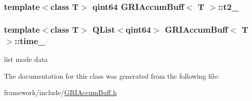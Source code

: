 \hypertarget{classGRIAccumBuff_ad0a83f96ba721ae8206fe6f0d9d80149}{
\subsubsection[{t2\-\_\-}]{\setlength{\rightskip}{0pt plus 5cm}template$<$class \-T$>$ qint64 {\bf \-G\-R\-I\-Accum\-Buff}$<$ \-T $>$\-::{\bf t2\-\_\-}}}\label{classGRIAccumBuff_ad0a83f96ba721ae8206fe6f0d9d80149}
\hypertarget{classGRIAccumBuff_a9e86e603efd9fd1fc2b81e150886a110}{
\subsubsection[{time\-\_\-}]{\setlength{\rightskip}{0pt plus 5cm}template$<$class \-T$>$ \-Q\-List$<$qint64$>$ {\bf \-G\-R\-I\-Accum\-Buff}$<$ \-T $>$\-::{\bf time\-\_\-}}}\label{classGRIAccumBuff_a9e86e603efd9fd1fc2b81e150886a110}


list mode data 



\-The documentation for this class was generated from the following file\-:\begin{DoxyCompactItemize}
\item 
framework/include/\hyperlink{GRIAccumBuff_8h}{\-G\-R\-I\-Accum\-Buff.\-h}\end{DoxyCompactItemize}

